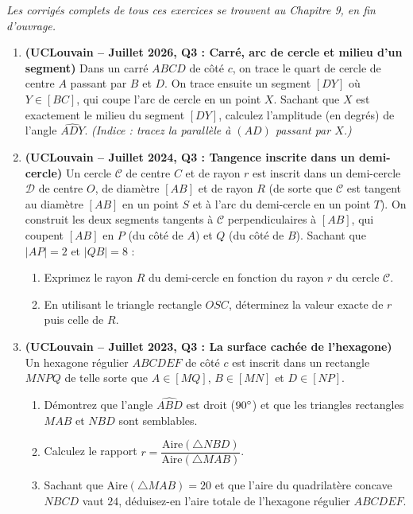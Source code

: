 \emph{Les corrigés complets de tous ces exercices se trouvent au Chapitre 9, en fin d'ouvrage.}

\begin{enumerate}[label=\textbf{Exercice 5.\arabic* --}, align=left, leftmargin=*]

    \item \textbf{(UCLouvain -- Juillet 2026, Q3 : Carré, arc de cercle et milieu d'un segment)}
    Dans un carré $ABCD$ de côté $c$, on trace le quart de cercle de centre $A$ passant par $B$ et $D$. On trace ensuite un segment $[DY]$ où $Y \in [BC]$, qui coupe l'arc de cercle en un point $X$. Sachant que $X$ est exactement le milieu du segment $[DY]$, calculez l'amplitude (en degrés) de l'angle $\widehat{ADY}$. \emph{(Indice : tracez la parallèle à $(AD)$ passant par $X$.)}

    \item \textbf{(UCLouvain -- Juillet 2024, Q3 : Tangence inscrite dans un demi-cercle)}
    Un cercle $\mathcal{C}$ de centre $C$ et de rayon $r$ est inscrit dans un demi-cercle $\mathcal{D}$ de centre $O$, de diamètre $[AB]$ et de rayon $R$ (de sorte que $\mathcal{C}$ est tangent au diamètre $[AB]$ en un point $S$ et à l'arc du demi-cercle en un point $T$). On construit les deux segments tangents à $\mathcal{C}$ perpendiculaires à $[AB]$, qui coupent $[AB]$ en $P$ (du côté de $A$) et $Q$ (du côté de $B$). Sachant que $|AP| = 2$ et $|QB| = 8$ :
    \begin{enumerate}[label=(\alph*)]
        \item Exprimez le rayon $R$ du demi-cercle en fonction du rayon $r$ du cercle $\mathcal{C}$.
        \item En utilisant le triangle rectangle $OSC$, déterminez la valeur exacte de $r$ puis celle de $R$.
    \end{enumerate}

    \item \textbf{(UCLouvain -- Juillet 2023, Q3 : La surface cachée de l'hexagone)}
    Un hexagone régulier $ABCDEF$ de côté $c$ est inscrit dans un rectangle $MNPQ$ de telle sorte que $A \in [MQ]$, $B \in [MN]$ et $D \in [NP]$.
    \begin{enumerate}[label=(\alph*)]
        \item Démontrez que l'angle $\widehat{ABD}$ est droit ($90\degree$) et que les triangles rectangles $MAB$ et $NBD$ sont semblables.
        \item Calculez le rapport $r = \dfrac{\text{Aire}(\triangle NBD)}{\text{Aire}(\triangle MAB)}$.
        \item Sachant que $\text{Aire}(\triangle MAB) = 20$ et que l'aire du quadrilatère concave $NBCD$ vaut $24$, déduisez-en l'aire totale de l'hexagone régulier $ABCDEF$.
    \end{enumerate}


\end{enumerate}
